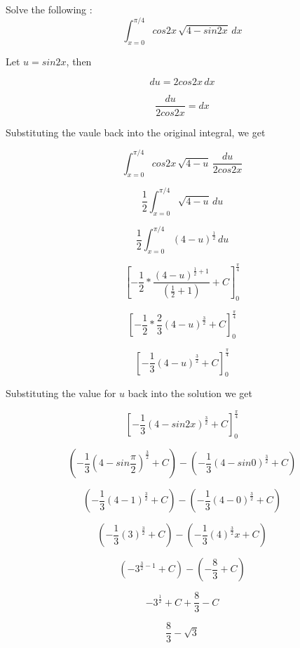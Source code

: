 \documentclass{article}
\begin{document}
	Solve the following : 
	\[
	\int_{x=0}^{\pi/4}cos2x\,\sqrt{4-sin2x}\,dx
	\]
	
	Let $u = sin2x$, then 
	
	
	\[
	du = 2cos2x\,dx
	\]
	
	\[
	\frac{du}{2cos2x} = dx
	\]
	
	Substituting the vaule back into the original integral, we get 
	
	\[
		\int_{x=0}^{\pi/4}cos2x\,\sqrt{4-u}\,\frac{du}{2cos2x}
	\]
	
	\[
	      \frac{1}{2}\int_{x=0}^{\pi/4}\sqrt{4-u}\,{du}
	\]
	
	\[
	\frac{1}{2}\int_{x=0}^{\pi/4}{(4-u)}^\frac{1}{2}\,{du}
	\]
	
	\[
	\left[-\frac{1}{2}* \frac{(4-u)^{\frac{1}{2} + 1}} {(\frac{1}{2} + 1)} + C\right]_0^\frac{\pi}{4}
	\]
	
	
	\[
	\left[-\frac{1}{2}*\frac{2}{3}{(4-u)^{\frac{3}{2}}} + C\right]_0^\frac{\pi}{4}
	\]
	
	\[
	\left[-\frac{1}{3}{(4-u)^{\frac{3}{2}}} + C\right]_0^\frac{\pi}{4}
	\]
	
	Substituting the value for $u$ back into the solution we get
	
	\[
	\left[-\frac{1}{3}{(4-sin2x)^{\frac{3}{2}}} + C\right]_0^\frac{\pi}{4}
	\]
	
	\[
	(-\frac{1}{3}{(4-sin\frac{\pi}{2})^{\frac{3}{2}}} + C) - (-\frac{1}{3}{(4-sin0)^{\frac{3}{2}}} + C)
	\]
	
	\[
	(-\frac{1}{3}{(4-1)^{\frac{3}{2}}} + C) - (-\frac{1}{3}{(4-0)^{\frac{3}{2}}} + C)
	\]
	
	
	\[
	(-\frac{1}{3}{(3)^{\frac{3}{2}}} + C) - (-\frac{1}{3}{(4)^{\frac{3}{2}}x} + C)
	\]
	
	\[
	(-3^{\frac{3}{2} - 1} + C) - (-\frac{8}{3} + C)
	\]
	
	\[
	-3^{\frac{1}{2}} + C + \frac{8}{3} - C
	\]
	
	\[
	\frac{8}{3} -\sqrt{3}
	\]
	
	
\end{document}
